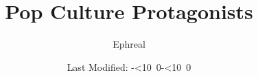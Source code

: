 \def\mytoday{\leavevmode\hbox{\the\year-\twodigits\month-\twodigits\day}}
\def\twodigits#1{\ifnum#1<10 0\fi\the#1}

\title{Pop Culture Protagonists}
\author{Ephreal}
\date{Last Modified: \mytoday}
\maketitle
\tableofcontents
